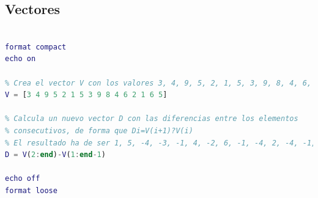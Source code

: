 \subsection{Vectores}

\begin{lstlisting}[language=Matlab]
% Ejercicio 6. Diferencias

format compact
echo on

% Crea el vector V con los valores 3, 4, 9, 5, 2, 1, 5, 3, 9, 8, 4, 6, 2, 1, 6, 5.
V = [3 4 9 5 2 1 5 3 9 8 4 6 2 1 6 5]

% Calcula un nuevo vector D con las diferencias entre los elementos
% consecutivos, de forma que Di=V(i+1)?V(i)
% El resultado ha de ser 1, 5, -4, -3, -1, 4, -2, 6, -1, -4, 2, -4, -1, 5, -1.
D = V(2:end)-V(1:end-1)

echo off
format loose
\end{lstlisting}



